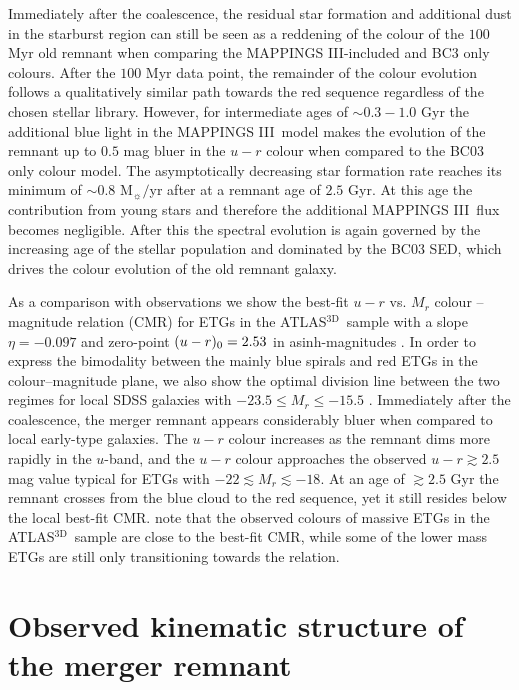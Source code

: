 \documentclass[a4paper,fleqn,usenatbib]{mnras}
\newcommand{\atlas}{\textsc{ATLAS$^\mathrm{3D}$}}
\newcommand{\mappings}{\textsc{MAPPINGS III}}
\begin{document}
Immediately after the coalescence, the residual star formation 
and additional dust in the starburst region can still be seen as a reddening
of the colour of the $100$ Myr old remnant when comparing the \mappings-included and BC3 only colours. 
After the $100$ Myr data point, the remainder of the
colour evolution follows a qualitatively similar path towards the red sequence regardless of the chosen stellar library.
However, for intermediate ages of $\sim 0.3-1.0$ Gyr the additional blue light in the \mappings\ model 
makes the evolution of the remnant up to $0.5$ mag bluer in the  
$u-r$ colour when compared to the BC03 only colour model.
The asymptotically decreasing star formation rate reaches its minimum of $\sim 0.8$ M$_{\sun}/$yr after at a remnant age 
of $2.5$ Gyr. At this age
the contribution from young stars and therefore the additional \mappings\ flux becomes negligible.
After this the spectral evolution is again governed by the increasing age of the stellar population
and dominated by the BC03 SED, which drives the colour evolution of the old remnant galaxy. 

As a comparison with observations we show the best-fit $u-r$ vs. $M_r$ colour --
magnitude relation (CMR) for ETGs in the \atlas\ sample with a
slope $\eta=-0.097$ and zero-point $(u-r)_{\rm{0}}=2.53$ in asinh-magnitudes \citep{2011MNRAS.413..813C}.
In order to express the bimodality between the mainly blue spirals and red ETGs in the colour--magnitude plane, we also show the
optimal division line between the two regimes for local SDSS galaxies with $-23.5 \le M_r \le -15.5$ \citep{2004ApJ...600..681B}.
Immediately after the coalescence, the merger remnant appears considerably bluer when compared to local early-type galaxies.
The $u-r$ colour increases as the remnant dims more rapidly in the $u$-band, and the $u-r$ colour
approaches the observed $u-r \gtrsim2.5$ mag value
typical for ETGs with $-22 \lesssim M_r\lesssim -18$. At an
age of $\gtrsim2.5$ Gyr the remnant crosses from the blue cloud to the red sequence, 
yet it still resides below the local best-fit CMR.
\citet{2011MNRAS.413..813C} note that the observed colours of massive ETGs in the \atlas\ sample
are close to the best-fit CMR, while some of the lower mass ETGs are still only transitioning towards the relation.



\section{Observed kinematic structure of the merger remnant}\label{section:kinemetry}
\end{document}
